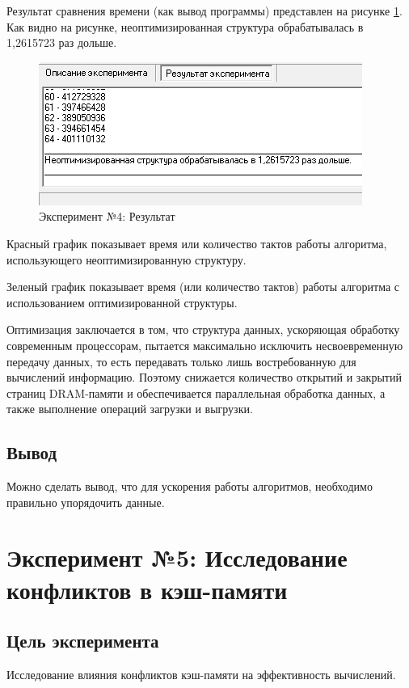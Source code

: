 Результат сравнения времени (как вывод программы) представлен на
рисунке \ref{ex:t4-data}. Как видно на рисунке, неоптимизированная структура обрабатывалась в 1,2615723 раз дольше.

\begin{figure}[h]
	\centering
	\includegraphics[height=0.15\textheight]{img/t4-data}
	\caption{Эксперимент №4: Результат}
	\label{ex:t4-data}
\end{figure}

Красный график показывает время или количество тактов работы алгоритма, использующего неоптимизированную структуру.

Зеленый график показывает время (или количество тактов) работы алгоритма с использованием оптимизированной структуры.

Оптимизация заключается в том, что структура данных, ускоряющая обработку современным процессорам, пытается максимально исключить несвоевременную передачу данных, то есть передавать только лишь востребованную для вычислений информацию. Поэтому снижается количество открытий и закрытий страниц DRAM-памяти и обеспечивается параллельная обработка данных, а также выполнение операций загрузки и выгрузки.

\subsection*{Вывод}
Можно сделать вывод, что для ускорения работы алгоритмов, необходимо правильно упорядочить данные.

\newpage

\section*{Эксперимент №5: Исследование конфликтов в кэш-памяти}

\subsection*{Цель эксперимента}
Исследование влияния конфликтов кэш-памяти на эффективность вычислений.


